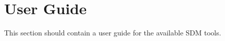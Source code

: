 \chapter{User Guide}\label{sec-user-guide}
	
This section should contain a user guide for the available SDM tools.